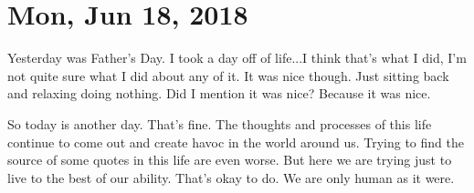 \section{Mon, Jun 18, 2018}

Yesterday was Father's Day. I took a day off of life...I think that's what I
did, I'm not quite sure what I did about any of it. It was nice though. Just
sitting back and relaxing doing nothing. Did I mention it was nice? Because it
was nice.

So today is another day. That's fine. The thoughts and processes of this life
continue to come out and create havoc in the world around us. Trying to find the
source of some quotes in this life are even worse. But here we are trying just
to live to the best of our ability. That's okay to do. We are only human as it
were.
